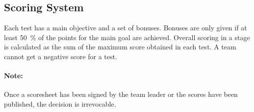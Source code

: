 \subsection{Scoring System}
\label{sec:rules:scoringsystem}
Each test has a main objective and a set of bonuses.
Bonuses are only given if at least \SI{50}{\percent} of the points for the main goal are achieved. 
Overall scoring in a stage is calculated as the sum of the maximum score obtained in each test. 
A team cannot get a negative score for a test.

\paragraph*{Note: } Once a scoresheet has been signed by the team leader or the scores have been published, the  decision is irrevocable.

